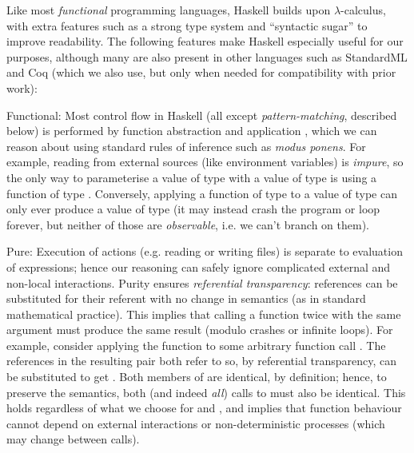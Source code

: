 Like most \emph{functional} programming languages, Haskell builds upon
$\lambda$-calculus, with extra features such as a strong type system and
``syntactic sugar'' to improve readability. The following features make Haskell
especially useful for our purposes, although many are also present in other
languages such as StandardML and Coq (which we also use, but only when needed
for compatibility with prior work):

\begin{description}

\item{Functional}: Most control flow in Haskell (all except
  \emph{pattern-matching}, described below) is performed by function abstraction
  and application , which we can reason about using standard rules of inference
  such as \emph{modus ponens}. For example, reading from external sources (like
  environment variables) is \emph{impure}, so the only way to parameterise a
  value of type  with a value of type  is using a function of type
  . Conversely, applying a function of type  to a value of
  type  can only ever produce a value of type  (it may instead crash
  the program or loop forever, but neither of those are \emph{observable}, i.e.
  we can't branch on them).

\item{Pure}: Execution of actions (e.g. reading or writing files) is separate to
  evaluation of expressions; hence our reasoning can safely ignore complicated
  external and non-local interactions. Purity ensures \emph{referential
    transparency}: references can be substituted for their referent with
  no change in semantics (as in standard mathematical practice). This implies
  that calling a function twice with the same argument must produce the same
  result (modulo crashes or infinite loops). For example, consider applying the
  function  to some arbitrary function call . The
  references  in the resulting pair  both refer to 
  so, by referential transparency, can be substituted to get
  . Both members of  are identical, by definition;
  hence, to preserve the semantics, both (and indeed \emph{all}) calls to
   must also be identical. This holds regardless of what we choose for
   and , and implies that function behaviour cannot depend on
  external interactions or non-deterministic processes (which may change between
  calls).


\end{description}

